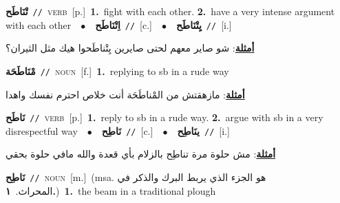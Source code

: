 \documentclass[10pt,a4paper,twoside]{article} %
\begin{document}
\begin{multicols}{2}
{\setlength\topsep{0pt}\textbf{\foreignlanguage{arabic}{تْنَاطَح}}\ {\color{gray}\texttt{//}\color{black}}\ \textsc{verb}\ [p.]\ \textbf{1.}~fight with each other.  \textbf{2.}~have a very intense argument with each other\ \ $\bullet$\ \ \setlength\topsep{0pt}\textbf{\foreignlanguage{arabic}{اِتْنَاطَح}}\ {\color{gray}\texttt{//}\color{black}}\ [c.]\ \ $\bullet$\ \ \setlength\topsep{0pt}\textbf{\foreignlanguage{arabic}{يِتْنَاطَح}}\ {\color{gray}\texttt{//}\color{black}}\ [i.]\  \begin{flushright}\color{gray}\foreignlanguage{arabic}{\textbf{\underline{\foreignlanguage{arabic}{أمثلة}}}: شو صاير معهم لحتى صايرين يِتْناطَحوا هيك مثل الثيران؟}\end{flushright}\color{black}} \vspace{2mm}

{\setlength\topsep{0pt}\textbf{\foreignlanguage{arabic}{مْنَاطَحَة}}\ {\color{gray}\texttt{//}\color{black}}\ \textsc{noun}\ [f.]\ \textbf{1.}~replying to sb in a rude way\  \begin{flushright}\color{gray}\foreignlanguage{arabic}{\textbf{\underline{\foreignlanguage{arabic}{أمثلة}}}: مازهقتش من المْناطَحَة أنت خلاص احترم نفسك واهدا}\end{flushright}\color{black}} \vspace{2mm}

{\setlength\topsep{0pt}\textbf{\foreignlanguage{arabic}{نَاطَح}}\ {\color{gray}\texttt{//}\color{black}}\ \textsc{verb}\ [p.]\ \textbf{1.}~reply to sb in a rude way.  \textbf{2.}~argue with sb in a very disrespectful way\ \ $\bullet$\ \ \setlength\topsep{0pt}\textbf{\foreignlanguage{arabic}{نَاطِح}}\ {\color{gray}\texttt{//}\color{black}}\ [c.]\ \ $\bullet$\ \ \setlength\topsep{0pt}\textbf{\foreignlanguage{arabic}{ينَاطِح}}\ {\color{gray}\texttt{//}\color{black}}\ [i.]\  \begin{flushright}\color{gray}\foreignlanguage{arabic}{\textbf{\underline{\foreignlanguage{arabic}{أمثلة}}}: مش حلوة مرة تناطِح بالزلام بأي قعدة والله مافي حلوة بحقي}\end{flushright}\color{black}} \vspace{2mm}

{\setlength\topsep{0pt}\textbf{\foreignlanguage{arabic}{نَاطِح}}\ {\color{gray}\texttt{//}\color{black}}\ \textsc{noun}\ [m.]\ \color{gray}(msa. \foreignlanguage{arabic}{هو الجزء الذي يربط البرك والذكر في المحراث.}~\foreignlanguage{arabic}{\textbf{١.}})\color{black}\ \textbf{1.}~the beam in a traditional plough\ } \vspace{2mm}


\end{multicols}
\end{document}
